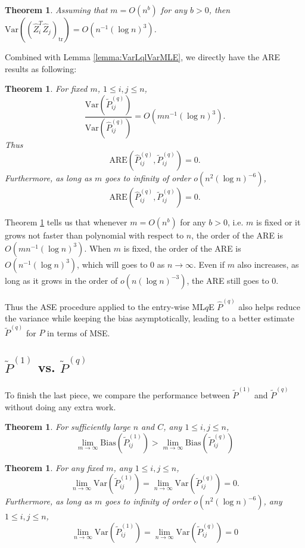 \documentclass[a4paper]{article}
\newtheorem{theorem}[fact]{Theorem}
\renewcommand{\hat}{\widehat}
\begin{document}
\begin{theorem}
\label{thm:VarASELq}
Assuming that $m = O(n^b)$ for any $b > 0$, then $\mathrm{Var}((\hat{Z}_i^T \hat{Z}_j)_{\mathrm{tr}}) = O(n^{-1} (\log n)^3)$.
\end{theorem}

Combined with Lemma \ref{lemma:VarLqlVarMLE}, we directly have the ARE results as following:

\begin{theorem}
\label{thm:ARELq}
For fixed $m$, $1 \le i, j \le n$,
\[
	\frac{\mathrm{Var}(\widetilde{P}_{ij}^{(q)})}{\mathrm{Var}(\hat{P}_{ij}^{(q)})}
    = O(m n^{-1} (\log n)^3).
\]
Thus
\[
	\mathrm{ARE}(\hat{P}_{ij}^{(q)}, \widetilde{P}_{ij}^{(q)}) = 0.
\]
Furthermore, as long as $m$ goes to infinity of order $o(n^2 (\log n)^{-6})$,
\[
	\mathrm{ARE}(\hat{P}_{ij}^{(q)}, \widetilde{P}_{ij}^{(q)}) = 0.
\]
\end{theorem}

Theorem \ref{thm:ARELq} tells us that whenever $m = O(n^b)$ for any $b > 0$, i.e. $m$ is fixed or it grows not faster than polynomial with respect to $n$, the order of the ARE is $O(m n^{-1} (\log n)^3)$. When $m$ is fixed, the order of the ARE is $O(n^{-1} (\log n)^3)$, which will goes to 0 as $n \to \infty$. Even if $m$ also increases, as long as it grows in the order of $o(n (\log n)^{-3})$, the ARE still goes to 0. 

Thus the ASE procedure applied to the entry-wise ML$q$E $\hat{P}^{(q)}$ also helps reduce the variance while keeping the bias asymptotically, leading to a better estimate $\widetilde{P}^{(q)}$ for $P$ in terms of MSE.


\subsection{$\widetilde{P}^{(1)}$ vs. $\widetilde{P}^{(q)}$}

To finish the last piece, we compare the performance between $\widetilde{P}^{(1)}$ and $\widetilde{P}^{(q)}$ without doing any extra work.

\begin{theorem}
\label{thm:biasL1andLq}
For sufficiently large $n$ and $C$, any $1 \le i,j \le n$,
\[
	\lim_{m \to \infty} \mathrm{Bias}(\widetilde{P}_{ij}^{(1)})
    > \lim_{m \to \infty} \mathrm{Bias}(\widetilde{P}_{ij}^{(q)})
\]
\end{theorem}

\begin{theorem}
\label{thm:varianceL1andLq}
For any fixed $m$, any $1 \le i,j \le n$,
\[
	\lim_{n \to \infty} \mathrm{Var}(\widetilde{P}_{ij}^{(1)})
    = \lim_{n \to \infty} \mathrm{Var}(\widetilde{P}_{ij}^{(q)}) = 0.
\]
Furthermore, as long as $m$ goes to infinity of order $o(n^2 (\log n)^{-6})$, any $1 \le i,j \le n$,
\[
	\lim_{n \to \infty} \mathrm{Var}(\widetilde{P}_{ij}^{(1)})
    = \lim_{n \to \infty} \mathrm{Var}(\widetilde{P}_{ij}^{(q)}) = 0
\]
\end{theorem}
\end{document}
